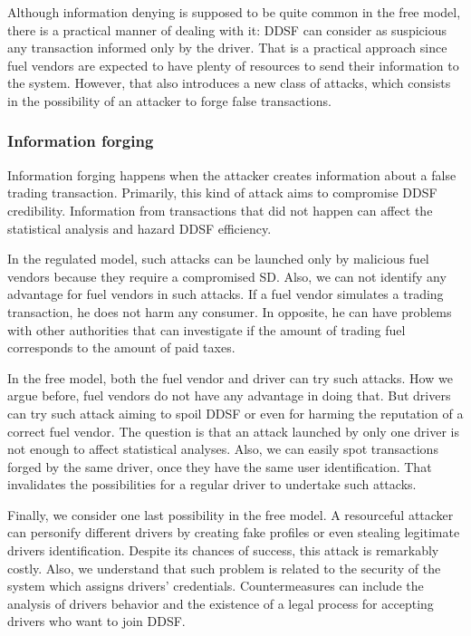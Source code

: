 \documentclass[sigplan]{acmart}
\begin{document}
Although information denying is supposed to be quite common in the free model, there is a practical manner of dealing with it: DDSF can consider as suspicious any transaction informed only by the driver.
That is a practical approach since fuel vendors are expected to have plenty of resources to send their information to the system.
However, that also introduces a new class of attacks, which consists in the possibility of an attacker to forge false transactions.

\subsubsection{Information forging}
Information forging happens when the attacker creates information about a false trading transaction.
Primarily, this kind of attack aims to compromise DDSF credibility.
Information from transactions that did not happen can affect the statistical analysis and hazard DDSF efficiency.

In the regulated model, such attacks can be launched only by malicious fuel vendors because they require a compromised SD.
Also, we can not identify any advantage for fuel vendors in such attacks.
If a fuel vendor simulates a trading transaction, he does not harm any consumer.
In opposite, he can have problems with other authorities that can investigate if the amount of trading fuel corresponds to the amount of paid taxes.

In the free model, both the fuel vendor and driver can try such attacks.
How we argue before, fuel vendors do not have any advantage in doing that.
But drivers can try such attack aiming to spoil DDSF or even for harming the reputation of a correct fuel vendor.
The question is that an attack launched by only one driver is not enough to affect statistical analyses.
Also, we can easily spot transactions forged by the same driver, once they have the same user identification.
That invalidates the possibilities for a regular driver to undertake such attacks.

Finally, we consider one last possibility in the free model.
A resourceful attacker can personify different drivers by creating fake profiles or even stealing legitimate drivers identification.
Despite its chances of success, this attack is remarkably costly.
Also, we understand that such problem is related to the security of the system which assigns drivers' credentials.
Countermeasures can include the analysis of drivers behavior and the existence of a legal process for accepting drivers who want to join DDSF.
\end{document}
